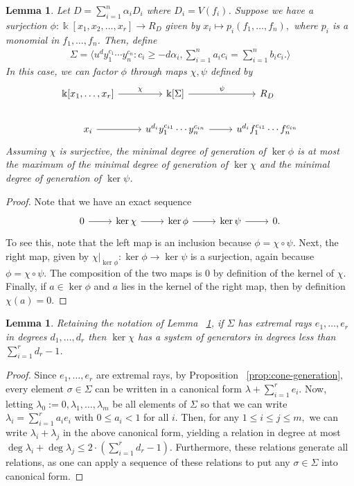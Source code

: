 \documentclass{amsart}
\theoremstyle{plain}
\newtheorem{lem}[thm]{Lemma}
\theoremstyle{definition}
\theoremstyle{remark}
\numberwithin{equation}{section}
\newcommand\bk{{\Bbbk}}
\newcommand\bida{a}
\newcommand\bidb{b}
\begin{document}
\begin{lem}
\label{lem:composite-map}
Let $D = \sum_{i=1}^{n}\alpha_i D_i$ where $D_i = V(f_i)$. Suppose we have a surjection $\phi: \bk[x_1,x_2,\ldots, x_r] \rightarrow R_D$ given by $x_i \mapsto p_i(f_1, \ldots, f_n),$ where $p_i$ is a monomial in $f_1,\ldots, f_n$. Then, define
\begin{align*}
	\Sigma = \langle u^d y_1^{c_1} \cdots y_n^{c_n} : c_i \geq -d \alpha_i, \sum_{i=1}^{n} \bida_i c_i = \sum_{i=1}^{n} \bidb_i c_i. \rangle 
\end{align*}
In this case, we can factor $\phi$ through maps $\chi, \psi$ defined by
$$\begin{tikzcd}
\bk[x_1,\ldots, x_r] \ar {r}{\chi} & \bk[\Sigma] \ar {r}{\psi} & R_D \\
x_i \ar r & u^{d_i}y_1^{c_{i1}} \cdots y_n^{c_{in}} \ar r & u^{d_i}f_1^{c_{i1}} \cdots f_n^{c_{in}}
\end{tikzcd}$$
Assuming $\chi$ is surjective, the minimal degree of generation of $\ker \phi$ is at most the maximum of the minimal degree of generation of $\ker \chi$ and the minimal degree of generation of $\ker \psi$.
\end{lem}
\begin{proof}
Note that we have an exact sequence
$$\begin{tikzcd}
0 \ar r & \ker \chi \ar r & \ker \phi \ar r & \ker \psi \ar r & 0.
\end{tikzcd}$$
To see this, note that the left map is an inclusion because $\phi = \chi \circ \psi$. Next, the right map, given by $\chi|_{\ker \phi}:\ker \phi \rightarrow \ker \psi$ is a surjection, again because $\phi = \chi \circ \psi$. The composition of the two maps is $0$ by definition of the kernel of $\chi$. Finally, if $a \in \ker \phi$ and $a$ lies in the kernel of the right map, then by definition $\chi(a) = 0$.
\end{proof}

\begin{lem}
\label{lem:bound-ker-chi}
Retaining the notation of Lemma ~\ref{lem:composite-map}, if $\Sigma$ has extremal rays $e_1,\ldots, e_r$ in degrees $d_1, \ldots, d_r$ then $\ker \chi$ has a system of generators in degrees less than $\sum_{i=1}^{r}d_r-1$.
\end{lem}
\begin{proof}
Since $e_1, \ldots, e_r$ are extremal rays, by Proposition ~\ref{prop:cone-generation}, every element $\sigma \in \Sigma$ can be written in a canonical form $\lambda + \sum_{i=1}^{r}e_i$. Now, letting $\lambda_0 := 0,\lambda_1, \ldots, \lambda_m$ be all elements of $\Sigma$ so that we can write $\lambda_i = \sum_{i=1}^{r}\bida_i e_i$ with $0 \leq \bida_i < 1$ for all $i$. Then, for any $1 \leq i \leq j \leq m,$ we can write $\lambda_i + \lambda_j$ in the above canonical form, yielding a relation in degree at most $\deg \lambda_i + \deg \lambda_j \leq 2 \cdot \left( \sum_{i=1}^{r}d_r -1 \right).$ Furthermore, these relations generate all relations, as one can apply a sequence of these relations to put any $\sigma \in \Sigma$ into canonical form.
\end{proof}
\end{document}
